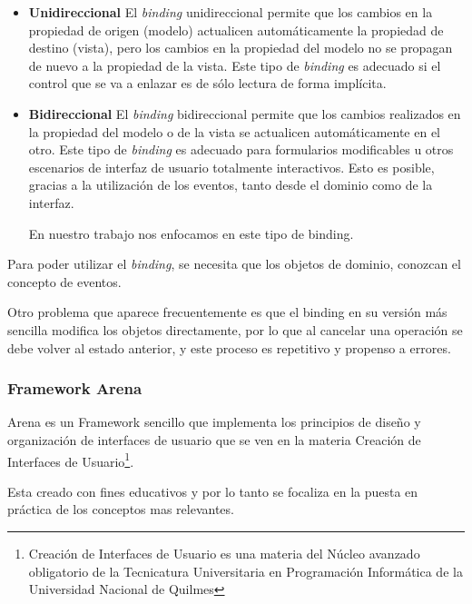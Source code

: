 	\begin {itemize}
	
		\item {\bf Unidireccional}
		El \emph{binding} unidireccional permite que los cambios en la propiedad de
		origen (modelo) actualicen automáticamente la propiedad de destino (vista),
		pero los cambios en la propiedad del modelo no se propagan de nuevo a la
		propiedad de la vista.
		Este tipo de \emph{binding} es adecuado si el control que se va a enlazar es
		de sólo lectura de forma implícita.		
		
		\item {\bf Bidireccional}
		El \emph{binding} bidireccional permite que los cambios realizados en la
		propiedad del modelo o de la vista se actualicen automáticamente en el
		otro. Este tipo de \emph{binding} es adecuado para formularios modificables u
		otros escenarios de interfaz de usuario totalmente interactivos.
		Esto es posible, gracias a la utilización de los eventos, tanto desde el
		dominio como de la interfaz.
	
		En nuestro trabajo nos enfocamos en este tipo de binding.
		 
	
	\end {itemize}
	


	Para poder utilizar el \emph{binding}, se necesita que los objetos de dominio, 
	conozcan el concepto de eventos.
	
	Otro problema que aparece frecuentemente es que el binding en su versión más 
	sencilla modifica los objetos directamente, por lo que al cancelar una operación 
	se debe volver al estado anterior, y este proceso es repetitivo y propenso a errores. 

	
\subsubsection{Framework Arena}
	Arena es un Framework sencillo que implementa los principios de diseño y
	organización de interfaces de usuario que se ven en la materia Creación de
	Interfaces de Usuario\footnote{Creación de Interfaces de Usuario
	es una materia del Núcleo avanzado obligatorio de la Tecnicatura
	Universitaria en Programación Informática de la Universidad Nacional de
	Quilmes}.
	
	Esta creado con fines educativos y por lo tanto se focaliza en la puesta en
	práctica de los conceptos mas relevantes.